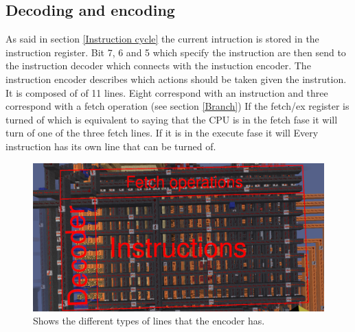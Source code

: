 \documentclass{article}
\begin{document}
\subsection{Decoding and encoding}
As said in section \ref{Instruction cycle} the current intruction is stored in the instruction register. Bit 7, 6 and 5 which specify the instruction are then send to the instruction decoder which connects with the instuction encoder. The instruction encoder describes which actions should be taken given the instrution. It is composed of of 11 lines. Eight correspond with an instruction and three correspond with a fetch operation (see section \ref{Branch}) If the fetch/ex register is turned of which is equivalent to saying that the CPU is in the fetch fase it will turn of one of the three fetch lines. If it is in the execute fase it will Every instruction has its own line that can be turned of.
\begin{figure}[h]
	\includegraphics[width=\textwidth]{Encoder Decoder.png}
	\caption{Shows the different types of lines that the encoder has.}
\end{figure}
\end{document}
